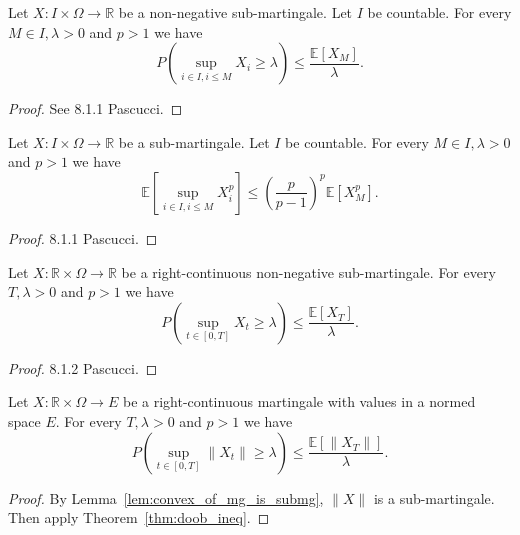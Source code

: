 \begin{lemma}\label{lem:doob_countable}
  Let $X:I\times\Omega\rightarrow \mathbb{R}$ be a non-negative sub-martingale.  Let $I$ be countable.
  For every $M\in I,\lambda > 0$ and $p>1$ we have
  $$
  P\left( \sup_{i\in I, i\leq M}X_i\geq\lambda \right)\leq \frac{\mathbb{E}[X_M]}{\lambda}.
  $$
\end{lemma}
\begin{proof}
  See 8.1.1 Pascucci.
\end{proof}

\begin{lemma}\label{lem:doob_countable_cor}
  Let $X:I\times\Omega\rightarrow \mathbb{R}$ be a sub-martingale. Let $I$ be countable.
  For every $M\in I,\lambda > 0$ and $p>1$ we have
  $$
  \mathbb{E}\left[ \sup_{i\in I, i\leq M}X_i^p \right]\leq \left(\frac{p}{p-1}\right)^p\mathbb{E}[X_M^p].
  $$
\end{lemma}
\begin{proof}
  8.1.1 Pascucci.
\end{proof}

\begin{theorem}\label{thm:doob_ineq}
  Let $X:\mathbb{R}\times\Omega\rightarrow \mathbb{R}$ be a right-continuous non-negative sub-martingale.
  For every $T, \lambda>0$ and $p>1$ we have
  $$
  P\left( \sup_{t\in[0,T]}X_t\geq\lambda \right)\leq \frac{\mathbb{E}[X_T]}{\lambda}.
  $$
\end{theorem}
\begin{proof}
  8.1.2 Pascucci.
\end{proof}

\begin{corollary}\label{cor:doob_ineq}
  Let $X:\mathbb{R}\times\Omega\rightarrow E$ be a right-continuous martingale with values in a normed space $E$.
  For every $T, \lambda>0$ and $p>1$ we have
  $$
  P\left( \sup_{t\in[0,T]} \lVert X_t \rVert \geq \lambda \right) \leq \frac{\mathbb{E}[\lVert X_T \rVert]}{\lambda}.
  $$
\end{corollary}
\begin{proof}
  By Lemma~\ref{lem:convex_of_mg_is_submg}, $\lVert X \rVert$ is a sub-martingale.
  Then apply Theorem~\ref{thm:doob_ineq}.
\end{proof}

